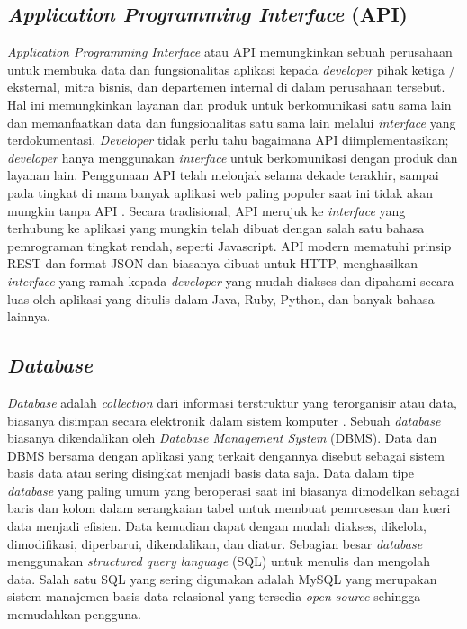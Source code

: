 \begin{flushleft}
\begin{justify}
        \subsection{\textit{Application Programming Interface} (API)}
            \textit{Application Programming Interface} atau API memungkinkan sebuah perusahaan untuk membuka data dan fungsionalitas aplikasi kepada \textit{developer} pihak ketiga / eksternal, mitra bisnis, dan departemen internal di dalam perusahaan tersebut. 
            Hal ini memungkinkan layanan dan produk untuk berkomunikasi satu sama lain dan memanfaatkan data dan fungsionalitas satu sama lain melalui \textit{interface} yang terdokumentasi. 
            \textit{Developer} tidak perlu tahu bagaimana API diimplementasikan; \textit{developer} hanya menggunakan \textit{interface} untuk berkomunikasi dengan produk dan layanan lain. 
            Penggunaan API telah melonjak selama dekade terakhir, sampai pada tingkat di mana banyak aplikasi web paling populer saat ini tidak akan mungkin tanpa API \cite{API}. Secara tradisional, API merujuk ke \textit{interface} yang terhubung ke aplikasi yang mungkin telah dibuat dengan salah satu bahasa pemrograman tingkat rendah, seperti Javascript. API modern mematuhi prinsip REST dan format JSON dan biasanya dibuat untuk HTTP, menghasilkan \textit{interface} yang ramah kepada \textit{developer} yang mudah diakses dan dipahami secara luas oleh aplikasi yang ditulis dalam Java, Ruby, Python, dan banyak bahasa lainnya.
            \\


        \subsection{\textit{Database}}
            \textit{Database} adalah \textit{collection} dari informasi terstruktur yang terorganisir atau data, biasanya disimpan secara elektronik dalam sistem komputer \cite{Database}. Sebuah \textit{database} biasanya dikendalikan oleh \textit{Database Management System} (DBMS). Data dan DBMS bersama dengan aplikasi yang terkait dengannya disebut sebagai sistem basis data atau sering disingkat menjadi basis data saja.
            Data dalam tipe \textit{database} yang paling umum yang beroperasi saat ini biasanya dimodelkan sebagai baris dan kolom dalam serangkaian tabel untuk membuat pemrosesan dan kueri data menjadi efisien. Data kemudian dapat dengan mudah diakses, dikelola, dimodifikasi, diperbarui, dikendalikan, dan diatur. Sebagian besar \textit{database} menggunakan \textit{structured query language} (SQL) untuk menulis dan mengolah data. 
            Salah satu SQL yang sering digunakan adalah MySQL yang merupakan sistem manajemen basis data relasional yang tersedia \textit{open source} sehingga memudahkan pengguna.
            \\

\end{justify}
\end{flushleft}
